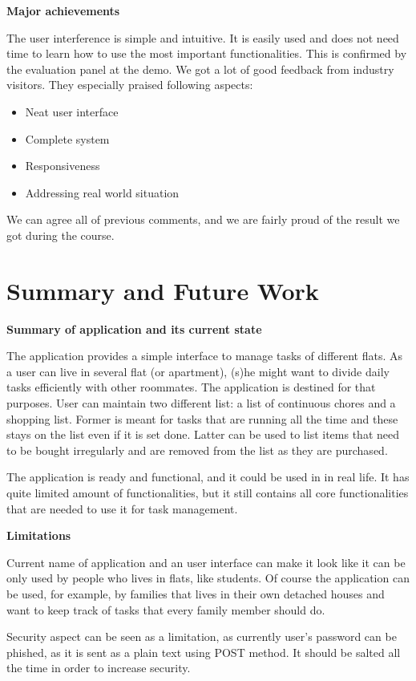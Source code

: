 \documentclass{sig-alt-release2}
\begin{document}
\textbf{Major achievements}

The user interference is simple and intuitive. It is easily used and does not
need time to learn how to use the most important functionalities. This is
confirmed by the evaluation panel at the demo. We got a lot of good feedback
from industry visitors. They especially praised following aspects:
\begin{itemize}
\item Neat user interface
\item Complete system
\item Responsiveness
\item Addressing real world situation
\end{itemize}
We can agree all of previous comments, and we are fairly proud of the result we
got during the course.

\section{Summary and Future Work}

\textbf{Summary of application and its current state}

The application provides a simple interface to manage tasks of different flats.
As a user can live in several flat (or apartment), (s)he might want to divide
daily tasks efficiently with other roommates. The application is destined for
that purposes. User can maintain two different list: a list of continuous chores
and a shopping list. Former is meant for tasks that are running all the time and
these stays on the list even if it is set done. Latter can be used to list items
that need to be bought irregularly and are removed from the list as they are
purchased.

The application is ready and functional, and it could be used in in real life.
It has quite limited amount of functionalities, but it still contains all core
functionalities that are needed to use it for task management.

\textbf{Limitations}

Current name of application and an user interface can make it look like it can
be only used by people who lives in flats, like students. Of course the
application can be used, for example, by families that lives in their own
detached houses and want to keep track of tasks that every family member should
do.

Security aspect can be seen as a limitation, as currently user's password can be
phished, as it is sent as a plain text using POST method. It should be salted
all the time in order to increase security.
\end{document}
